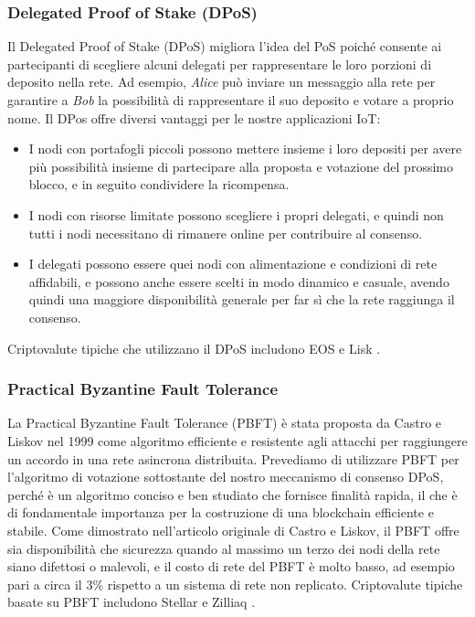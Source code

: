 \subsubsection{Delegated Proof of Stake (DPoS)}
Il Delegated Proof of Stake (DPoS) migliora l'idea del PoS poiché consente ai partecipanti di scegliere alcuni delegati per rappresentare le loro porzioni di deposito nella rete. Ad esempio, \emph{Alice} può inviare un messaggio alla rete per garantire a \emph{Bob} la possibilità di rappresentare il suo deposito e votare a proprio nome. Il DPos offre diversi vantaggi per le nostre applicazioni IoT:

\begin{itemize}
	\item I nodi con portafogli piccoli possono mettere insieme i loro depositi per avere più possibilità insieme di partecipare alla proposta e votazione del prossimo blocco, e in seguito condividere la ricompensa.

	\item I nodi con risorse limitate possono scegliere i propri delegati, e quindi non tutti i nodi necessitano di rimanere online per contribuire al consenso.

	\item I delegati possono essere quei nodi con alimentazione e condizioni di rete affidabili, e possono anche essere scelti in modo dinamico e casuale, avendo quindi una maggiore disponibilità generale per far sì che la rete raggiunga il consenso.
\end{itemize}

Criptovalute tipiche che utilizzano il DPoS includono EOS \cite{c9} e Lisk \cite{c18}.

\subsubsection{Practical Byzantine Fault Tolerance}
La Practical Byzantine Fault Tolerance (PBFT) è stata proposta da Castro e Liskov \cite{c7} nel 1999 come algoritmo efficiente e resistente agli attacchi per raggiungere un accordo in una rete asincrona distribuita. Prevediamo di utilizzare PBFT per l'algoritmo di votazione sottostante del nostro meccanismo di consenso DPoS, perché è un algoritmo conciso e ben studiato che fornisce finalità rapida, il che è di fondamentale importanza per la costruzione di una
blockchain efficiente e stabile. Come dimostrato nell'articolo originale di Castro e Liskov, il PBFT offre sia disponibilità che sicurezza quando al massimo un terzo dei nodi della rete siano difettosi o malevoli, e il costo di rete del PBFT è molto basso, ad esempio pari a circa il 3\% rispetto a un sistema di rete non replicato. Criptovalute tipiche basate su PBFT includono Stellar \cite{c30} e Zilliaq \cite{c38}.

